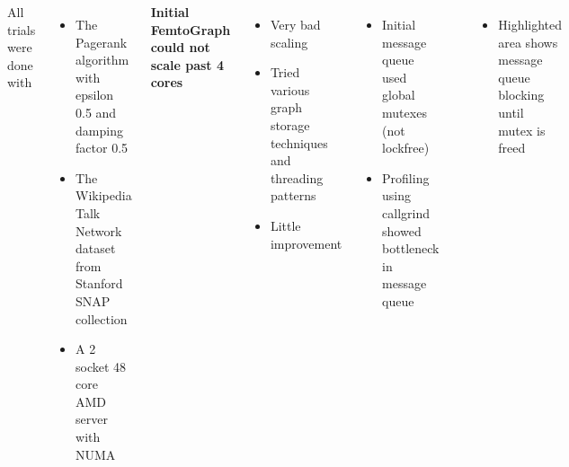 \documentclass[25pt, portrait,  margin=0mm, innermargin=15mm,
  blockverticalspace=15mm, colspace=15mm, subcolspace=8mm]{tikzposter}
\begin{document}
\begin{columns}
{    }

    
     {
      All trials were done with
      \begin{itemize}
      \item The Pagerank algorithm with epsilon 0.5 and damping factor 0.5
      \item The Wikipedia Talk Network dataset from Stanford SNAP collection
      \item A 2 socket 48 core AMD server with NUMA
        
      \end{itemize}
    }

     {
      \textbf{Initial FemtoGraph could not scale past 4 cores}
      \begin{itemize}
      \item  Very bad scaling
      \item Tried various graph storage techniques and threading patterns
      \item Little improvement
      \end{itemize}
      \begin{itemize}
      \item Initial message queue used global mutexes (not lockfree) 
      \item Profiling using callgrind showed bottleneck in message queue
      \end{itemize}
      \setcounter{figurecounter}{98}
      \begin{tikzfigure}
        \includegraphics[width=0.85\linewidth]{callgrind.png}
      \end{tikzfigure}
      \begin{itemize}
      \item Highlighted area shows message queue blocking until mutex is freed
      \end{itemize}
      

      }
    

\end{columns}
\end{document}
